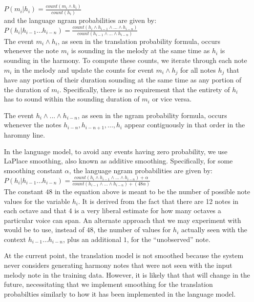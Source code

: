 \documentclass{sig-alternate}
\begin{document}
$P(m_{i} | h_{i}) = \frac{count(m_{i} \wedge h_{i})}{count(h_{i})}$\\

and the language ngram probabilities are given by: \\

$P(h_{i} | h_{i - 1} ... h_{i - n}) = \frac{count(h_{i} \wedge h_{i - 1} \wedge ... \wedge h_{i - n})}{count(h_{i - 1} \wedge ... \wedge h_{i - n})}$\\

The event $m_{i} \wedge h_{i}$, as seen in the translation probability formula, occurs whenever the note $m_{i}$ is sounding in the melody at the same time as $h_{i}$ is sounding in the harmony. To compute these counts, we iterate through each note $m_{i}$ in the melody and update the counts for event $m_{i} \wedge h_{j}$ for all notes $h_{j}$ that have any portion of their duration sounding at the same time as any portion of the duration of $m_{i}$. Specifically, there is no requirement that the entirety of $h_{i}$ has to sound within the sounding duration of $m_{i}$ or vice versa. 

The event $h_{i} \wedge ... \wedge h_{i - n}$, as seen in the ngram probability formula, occurs whenever the notes $h_{i - n}, h_{i - n + 1}, ..., h_{i}$ appear contiguously in that order in the haromny line. 

In the language model, to avoid any events having zero probability, we use LaPlace smoothing, also known as additive smoothing. Specifically, for some smoothing constant $\alpha$, the language ngram probabilities are given by: \\

$P(h_{i} | h_{i - 1} ... h_{i - n}) = \frac{count(h_{i} \wedge h_{i - 1} \wedge ... \wedge h_{i - n}) + \alpha}{count(h_{i - 1} \wedge ... \wedge h_{i - n}) + (48\alpha)}$\\

The constant $48$ in the equation above is meant to be the number of possible note values for the variable $h_{i}$. It is derived from the fact that there are 12 notes in each octave and that 4 is a very liberal estimate for how many octaves a particular voice can span. An alternate approach that we may experiment with would be to use, instead of $48$, the number of values for $h_{i}$ actually seen with the context $h_{i -1} ... h_{i - n}$, plus an additional $1$, for the ``unobserved'' note.

At the current point, the translation model is not smoothed because the system never considers generating harmony notes that were not seen with the input melody note in the training data. However, it is likely that that will change in the future, necessitating that we implement smoothing for the translation probabilties similarly to how it has been implemented in the language model. 
\end{document}
